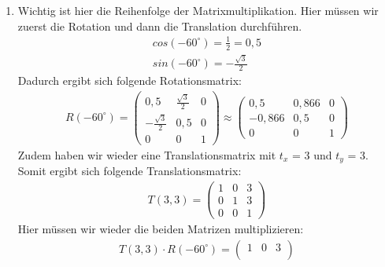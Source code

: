 \documentclass[11pt]{article}
\begin{document}
\begin{enumerate}
\begin{align*}
\begin{pmatrix*}
                                                                          0~~0~~1
                                                                        \end{pmatrix*}
        \end{align*}
  \item Wichtig ist hier die Reihenfolge der Matrixmultiplikation. Hier müssen wir zuerst die Rotation und dann die Translation durchführen.
        \begin{align*}
          cos(-60^\circ) = \frac{1}{2} = 0,5 \\
          sin(-60^\circ) = -\frac{\sqrt{3}}{2}
        \end{align*}
        Dadurch ergibt sich folgende Rotationsmatrix:
        \begin{align*}
          R(-60^\circ) = \begin{pmatrix*}
                           0,5 & \frac{\sqrt{3}}{2} & 0 \\
                           -\frac{\sqrt{3}}{2} & 0,5 & 0 \\
                           0 & 0 & 1
                         \end{pmatrix*} \approx \begin{pmatrix*}
                                                  0,5 & 0,866 & 0 \\
                                                  -0,866 & 0,5 & 0 \\
                                                  0 & 0 & 1
                                                \end{pmatrix*}
        \end{align*}
        Zudem haben wir wieder eine Translationsmatrix mit $t_x$ = 3 und $t_y$ = 3. Somit ergibt sich folgende Translationsmatrix:
        \begin{align*}
          T(3, 3) = \begin{pmatrix*}
                      1 & 0 & 3 \\
                      0 & 1 & 3 \\
                      0 & 0 & 1
                    \end{pmatrix*}
        \end{align*}
        Hier müssen wir wieder die beiden Matrizen multiplizieren:
        \begin{align*}
          T(3, 3) \cdot R(-60^\circ) = \begin{pmatrix*}
                                         1 & 0 & 3 \\

\end{pmatrix*}
\end{align*}
\end{enumerate}
\end{document}
